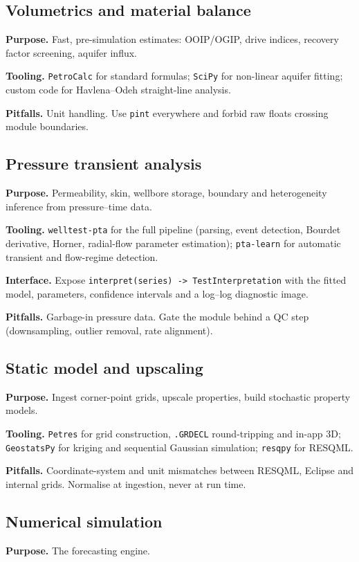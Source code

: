 \documentclass[11pt,a4paper]{article}
\begin{document}
\subsection{Volumetrics and material balance}
\textbf{Purpose.} Fast, pre-simulation estimates: OOIP/OGIP, drive indices,
recovery factor screening, aquifer influx.

\textbf{Tooling.} \texttt{PetroCalc} for standard formulas; \texttt{SciPy} for
non-linear aquifer fitting; custom code for Havlena--Odeh straight-line
analysis.

\textbf{Pitfalls.} Unit handling. Use \texttt{pint} everywhere and forbid raw
floats crossing module boundaries.

\subsection{Pressure transient analysis}
\textbf{Purpose.} Permeability, skin, wellbore storage, boundary and
heterogeneity inference from pressure--time data.

\textbf{Tooling.} \texttt{welltest-pta} for the full pipeline (parsing, event
detection, Bourdet derivative, Horner, radial-flow parameter estimation);
\texttt{pta-learn} for automatic transient and flow-regime detection.

\textbf{Interface.} Expose \texttt{interpret(series) -> TestInterpretation} with
the fitted model, parameters, confidence intervals and a log--log diagnostic
image.

\textbf{Pitfalls.} Garbage-in pressure data. Gate the module behind a QC step
(downsampling, outlier removal, rate alignment).

\subsection{Static model and upscaling}
\textbf{Purpose.} Ingest corner-point grids, upscale properties, build
stochastic property models.

\textbf{Tooling.} \texttt{Petres} for grid construction, \texttt{.GRDECL}
round-tripping and in-app 3D; \texttt{GeostatsPy} for kriging and sequential
Gaussian simulation; \texttt{resqpy} for RESQML.

\textbf{Pitfalls.} Coordinate-system and unit mismatches between RESQML, Eclipse
and internal grids. Normalise at ingestion, never at run time.

\subsection{Numerical simulation}
\textbf{Purpose.} The forecasting engine.
\end{document}
